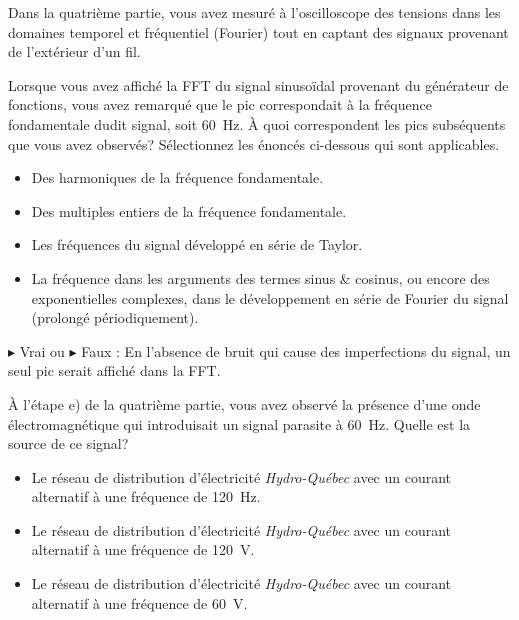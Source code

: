 \documentclass[canadien,12pt,oneside,letterpaper]{article}
\begin{document}
\begin{gradescope}
\begin{gradescope}
    \end{gradescope}
    \vspace{1ex}
    \item Dans la quatrième partie, vous avez mesuré à l'oscilloscope des tensions dans les domaines temporel et fréquentiel (Fourier) tout en captant des signaux provenant de l'extérieur d'un fil.
    \begin{gradescope} 
        \item Lorsque vous avez affiché la FFT du signal sinusoïdal provenant du générateur de fonctions, vous avez remarqué que le pic correspondait à la fréquence fondamentale dudit signal, soit \qty{60}{\Hz}. À quoi correspondent les pics subséquents que vous avez observés? Sélectionnez les énoncés ci-dessous qui sont applicables.
        \begin{itemize}[label=$\blacktriangleright$]
            \item Des harmoniques de la fréquence fondamentale.
            \item Des multiples entiers de la fréquence fondamentale.
            \item Les fréquences du signal développé en série de Taylor.
            \item La fréquence dans les arguments des termes sinus \& cosinus, ou encore des exponentielles complexes, dans le développement en série de Fourier du signal (prolongé périodiquement).
        \end{itemize}
        \item $\blacktriangleright$ Vrai ou $\blacktriangleright$ Faux : En l'absence de bruit qui cause des imperfections du signal, un seul pic serait affiché dans la FFT.
        \item À l'étape e) de la quatrième partie, vous avez observé la présence d'une onde électromagnétique qui introduisait un signal parasite à \qty{60}{\Hz}. Quelle est la source de ce signal?
		\begin{itemize}[label=$\blacktriangleright$]
        	\item Le réseau de distribution d'électricité \textit{Hydro-Québec} avec un courant alternatif à une fréquence de \qty{120}{\Hz}.
        	\item Le réseau de distribution d'électricité \textit{Hydro-Québec} avec un courant alternatif à une fréquence de \qty{120}{\volt}.
        	\item Le réseau de distribution d'électricité \textit{Hydro-Québec} avec un courant alternatif à une fréquence de \qty{60}{\volt}.

\end{itemize}
\end{gradescope}
\end{gradescope}
\end{document}

